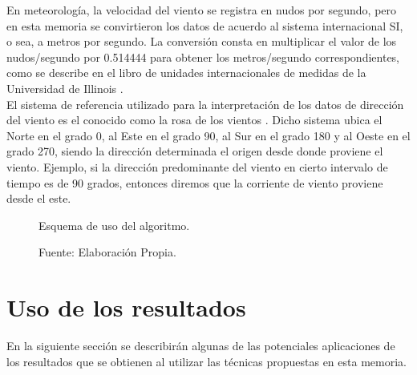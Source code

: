 En meteorología, la velocidad del viento se registra en nudos por segundo, pero en esta memoria se convirtieron los datos de acuerdo al sistema internacional SI, o sea, a metros por segundo. La conversión consta en multiplicar el valor de los nudos/segundo por 0.514444 para obtener los metros/segundo correspondientes, como se describe en el libro de unidades internacionales de medidas de la Universidad de Illinois \cite{KnotsMeterSeconds}.\\
El sistema de referencia utilizado para la interpretación de los datos de dirección del viento es el conocido como la rosa de los vientos \cite{RosaViento}. Dicho sistema ubica el Norte en el grado 0, al Este en el grado 90, al Sur en el grado 180 y al Oeste en el grado 270, siendo la dirección determinada el origen desde donde proviene el viento. Ejemplo, si la dirección predominante del viento en cierto intervalo de tiempo es de 90 grados, entonces diremos que la corriente de viento proviene desde el este.

\begin{figure}[ht!]
\caption{Esquema de uso del algoritmo.}
\caption*{Fuente: Elaboración Propia.}

\label{esq:PSO_ALG}
\end{figure}

\section{Uso de los resultados}
En la siguiente sección se describirán algunas de las potenciales aplicaciones de los resultados que se obtienen al utilizar las técnicas propuestas en esta memoria.
